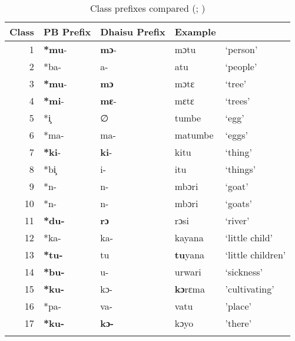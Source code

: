 \documentclass[output=paper,colorlinks,citecolor=brown]{langscibook}
\begin{document}
\begin{table}%
\caption{Class prefixes compared (\citealt[97]{Meeussen1967}; \citealt[14]{RugemaliraEtAl2019})}
\label{tab:ngonyani:14}
    \begin{tabularx}{\textwidth}{r XXX l}
    \lsptoprule
        Class & PB Prefix & Dhaisu Prefix & Example\\
    \midrule
        1 & \textbf{*mu}-   & \textbf{mɔ}-  & mɔtu              & ‘person’\\
        2 & *ba-            & a-            & atu               & ‘people’\\
        3 & \textbf{*mu}-   & \textbf{mɔ }  & mɔtɛ              & ‘tree’\\
        4 & \textbf{*mi}-   & \textbf{mɛ}-  & mɛtɛ              & ‘trees’\\
        5 & *i̧              & ∅             & tumbe             & ‘egg’\\
        6 & *ma-            & ma-           & matumbe           & ‘eggs’\\
        7 & \textbf{*ki}-   & \textbf{ki}-  & kitu              & ‘thing’\\
        8 & *bi̧             & i-            & itu               & ‘things’\\
        9 & *n-             & n-            & mbɔri             & ‘goat’\\
        10 & *n-            & n-            & mbɔri             & ‘goats’\\
        11 & \textbf{*du-}  & \textbf{rɔ}   & rɔsi              & ‘river’\\
        12 & *ka-           & ka-           & kayana            & ‘little child’\\
        13 & \textbf{*tu-}  & tu            & \textbf{tu}yana   & ‘little children’\\
        14 & \textbf{*bu-}  & u-            & urwari            & ‘sickness’\\
        15 & \textbf{*ku-}  & kɔ-           & \textbf{kɔ}rɛma   & 'cultivating'  \\
        16 & *pa-           & va-           & vatu              & 'place’\\
        17 & \textbf{*ku-}  & \textbf{kɔ-}  & kɔyo              & 'there' \\
    \lspbottomrule
    \end{tabularx}
\end{table}
\end{document}
